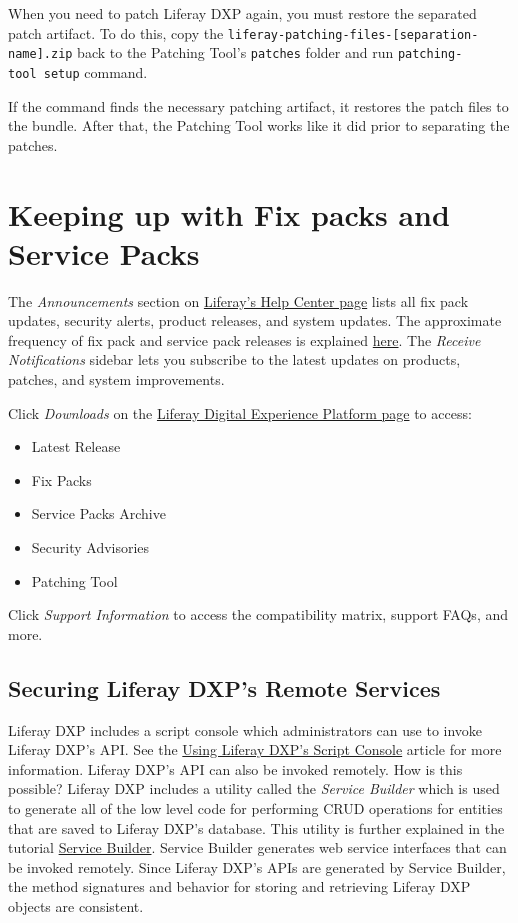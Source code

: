 When you need to patch Liferay DXP again, you must restore the separated
patch artifact. To do this, copy the
\texttt{liferay-patching-files-{[}separation-name{]}.zip} back to the
Patching Tool's \texttt{patches} folder and run
\texttt{patching-tool\ setup} command.

If the command finds the necessary patching artifact, it restores the
patch files to the bundle. After that, the Patching Tool works like it
did prior to separating the patches.

\chapter{Keeping up with Fix packs and Service
Packs}\label{keeping-up-with-fix-packs-and-service-packs}

The \emph{Announcements} section on
\href{https://help.liferay.com/hc}{Liferay's Help Center page} lists all
fix pack updates, security alerts, product releases, and system updates.
The approximate frequency of fix pack and service pack releases is
explained
\href{/docs/7-0/deploy/-/knowledge_base/d/patching-basics}{here}. The
\emph{Receive Notifications} sidebar lets you subscribe to the latest
updates on products, patches, and system improvements.

Click \emph{Downloads} on the
\href{https://help.liferay.com/hc/en-us/categories/360000872531}{Liferay
Digital Experience Platform page} to access:

\begin{itemize}
\tightlist
\item
  Latest Release
\item
  Fix Packs
\item
  Service Packs Archive
\item
  Security Advisories
\item
  Patching Tool
\end{itemize}

Click \emph{Support Information} to access the compatibility matrix,
support FAQs, and more.

\section{Securing Liferay DXP's Remote
Services}\label{securing-liferay-dxps-remote-services}

Liferay DXP includes a script console which administrators can use to
invoke Liferay DXP's API. See the
\href{/docs/7-0/user/-/knowledge_base/u/running-scripts-from-the-script-console}{Using
Liferay DXP's Script Console} article for more information. Liferay DXP's
API can also be invoked remotely. How is this possible? Liferay DXP
includes a utility called the \emph{Service Builder} which is used to
generate all of the low level code for performing CRUD operations for
entities that are saved to Liferay DXP's database. This utility is
further explained in the tutorial
\href{/docs/7-0/tutorials/-/knowledge_base/t/service-builder}{Service
Builder}. Service Builder generates web service interfaces that can be
invoked remotely. Since Liferay DXP's APIs are generated by Service
Builder, the method signatures and behavior for storing and retrieving
Liferay DXP objects are consistent.

